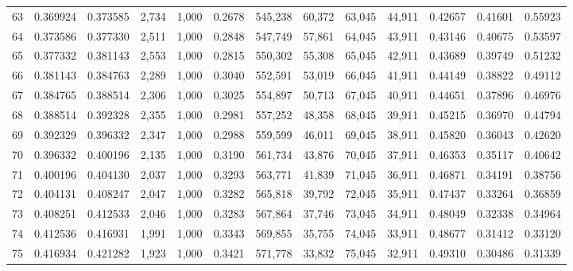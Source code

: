 \begin{tabular}{rrrrrrrrrrrrr}
63  &  0.369924 &  0.373585 &   2,734 &  1,000 &                                     0.2678 &  545,238 &   60,372 &   63,045 &   44,911 &  0.42657 &  0.41601 &  0.55923 \\
64  &  0.373586 &  0.377330 &   2,511 &  1,000 &                                     0.2848 &  547,749 &   57,861 &   64,045 &   43,911 &  0.43146 &  0.40675 &  0.53597 \\
65  &  0.377332 &  0.381143 &   2,553 &  1,000 &                                     0.2815 &  550,302 &   55,308 &   65,045 &   42,911 &  0.43689 &  0.39749 &  0.51232 \\
66  &  0.381143 &  0.384763 &   2,289 &  1,000 &                                     0.3040 &  552,591 &   53,019 &   66,045 &   41,911 &  0.44149 &  0.38822 &  0.49112 \\
67  &  0.384765 &  0.388514 &   2,306 &  1,000 &                                     0.3025 &  554,897 &   50,713 &   67,045 &   40,911 &  0.44651 &  0.37896 &  0.46976 \\
68  &  0.388514 &  0.392328 &   2,355 &  1,000 &                                     0.2981 &  557,252 &   48,358 &   68,045 &   39,911 &  0.45215 &  0.36970 &  0.44794 \\
69  &  0.392329 &  0.396332 &   2,347 &  1,000 &                                     0.2988 &  559,599 &   46,011 &   69,045 &   38,911 &  0.45820 &  0.36043 &  0.42620 \\
70  &  0.396332 &  0.400196 &   2,135 &  1,000 &                                     0.3190 &  561,734 &   43,876 &   70,045 &   37,911 &  0.46353 &  0.35117 &  0.40642 \\
71  &  0.400196 &  0.404130 &   2,037 &  1,000 &                                     0.3293 &  563,771 &   41,839 &   71,045 &   36,911 &  0.46871 &  0.34191 &  0.38756 \\
72  &  0.404131 &  0.408247 &   2,047 &  1,000 &                                     0.3282 &  565,818 &   39,792 &   72,045 &   35,911 &  0.47437 &  0.33264 &  0.36859 \\
73  &  0.408251 &  0.412533 &   2,046 &  1,000 &                                     0.3283 &  567,864 &   37,746 &   73,045 &   34,911 &  0.48049 &  0.32338 &  0.34964 \\
74  &  0.412536 &  0.416931 &   1,991 &  1,000 &                                     0.3343 &  569,855 &   35,755 &   74,045 &   33,911 &  0.48677 &  0.31412 &  0.33120 \\
75  &  0.416934 &  0.421282 &   1,923 &  1,000 &                                     0.3421 &  571,778 &   33,832 &   75,045 &   32,911 &  0.49310 &  0.30486 &  0.31339 \\

\end{tabular}
